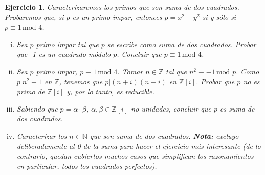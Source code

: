 \documentclass[a4paper,11pt]{article}
\newcommand{\Zm}[1]{\ensuremath{\mathbb{Z}[#1]}}
\newcommand{\Cong}[3]{\ensuremath{#1 \equiv #2 \, \textrm{mod } #3}}
\newcommand{\Div}[2]{\ensuremath{#1 | #2}}
\newtheorem*{ej}{Ejercicio}
\begin{document}
\begin{ej} 
Caracterizaremos los primos que son suma de dos cuadrados. Probaremos que, si $p$ es un
primo impar, entonces $p = x^2 + y^2$ si y sólo si $\Cong{p}{1}{4}$.

\begin{enumerate}[i.]
    \item Sea $p$ primo impar tal que $p$ se escribe como suma de dos cuadrados.
    Probar que -1 es un cuadrado módulo $p$. Concluir que $\Cong{p}{1}{4}$.

    \item Sea $p$ primo impar, $\Cong{p}{1}{4}$. Tomar $n \in \mathbb{Z}$ tal que
    $\Cong{n^2}{-1}{p}$. Como $\Div{p}{n^2 + 1}$ en $\mathbb{Z}$, tenemos que
    $\Div{p}{(n + i)(n - i)}$ en \Zm{i}. Probar que $p$ no es primo de \Zm{i} y, 
    por lo tanto, es reducible.

    \item Sabiendo que $p = \alpha \cdot \beta$, $\alpha, \beta \in \Zm{i}$ no 
    unidades, concluir que $p$ es suma de dos cuadrados.

    \item Caracterizar los $n \in \mathbb{N}$ que son suma de dos cuadrados.
    \textbf{Nota:} excluyo deliberadamente al 0 de la suma para hacer el ejercicio
    más interesante (de lo contrario, quedan cubiertos muchos casos que simplifican
    los razonamientos --en particular, todos los cuadrados perfectos).
\end{enumerate}

\end{ej}
\end{document}

